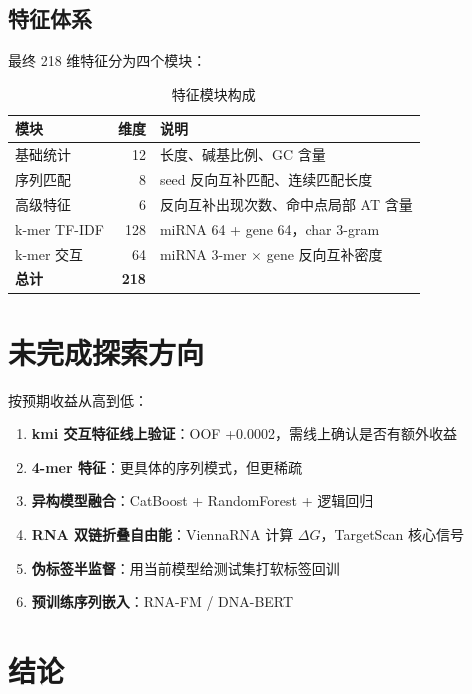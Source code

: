 \documentclass[11pt,a4paper]{article}
\begin{document}
\subsection{特征体系}

最终 218 维特征分为四个模块：

\begin{table}[H]
\centering
\caption{特征模块构成}
\begin{tabular}{lrl}
\toprule
模块 & 维度 & 说明 \\
\midrule
基础统计 & 12 & 长度、碱基比例、GC 含量 \\
序列匹配 & 8 & seed 反向互补匹配、连续匹配长度 \\
高级特征 & 6 & 反向互补出现次数、命中点局部 AT 含量 \\
k-mer TF-IDF & 128 & miRNA 64 + gene 64，char 3-gram \\
k-mer 交互 & 64 & miRNA 3-mer $\times$ gene 反向互补密度 \\
\midrule
\textbf{总计} & \textbf{218} & \\
\bottomrule
\end{tabular}
\end{table}

\section{未完成探索方向}

按预期收益从高到低：

\begin{enumerate}
    \item \textbf{kmi 交互特征线上验证}：OOF +0.0002，需线上确认是否有额外收益
    \item \textbf{4-mer 特征}：更具体的序列模式，但更稀疏
    \item \textbf{异构模型融合}：CatBoost + RandomForest + 逻辑回归
    \item \textbf{RNA 双链折叠自由能}：ViennaRNA 计算 $\Delta G$，TargetScan 核心信号
    \item \textbf{伪标签半监督}：用当前模型给测试集打软标签回训
    \item \textbf{预训练序列嵌入}：RNA-FM / DNA-BERT
\end{enumerate}

\section{结论}
\end{document}
